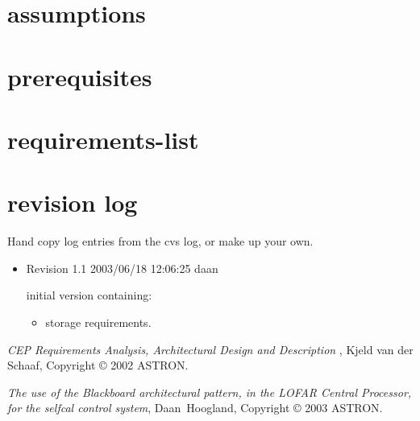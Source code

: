 \documentclass[]{lofar}
\begin{document}
\newcommand{\dbappendix}[1]{\section{#1}}%

\appendix

  \dbappendix{assumptions}
  \label{app:assumptions}\hypertarget{app:assumptions}{}


  \dbappendix{prerequisites}
  \label{app:prerequisites}\hypertarget{app:prerequisites}{}


  \dbappendix{requirements-list}
  \label{app:requirements-list}\hypertarget{app:requirements-list}{}%


  \printindex

  \dbappendix{revision log}
  \label{app:revision-log}\hypertarget{app:revision-log}{}%

    Hand copy log entries from the cvs log, or make up your own.

    \begin{itemize}

      \item 

        Revision 1.1 2003/06/18 12:06:25 daan

        initial version containing:
        \begin{itemize}

	  \item 

            storage requirements.

        \end{itemize}

    \end{itemize}

  
  \begin{thebibliography}{WIDELABEL}

      \emph{CEP Requirements Analysis, Architectural Design and
      Description} , Kjeld van der Schaaf, Copyright \copyright{} 2002
      ASTRON.

      \emph{The use of the Blackboard architectural pattern, in the LOFAR Central Processor, for the selfcal control system},
      Daan\ Hoogland,
      Copyright \copyright{} 2003 ASTRON.

  \end{thebibliography}
\end{document}
